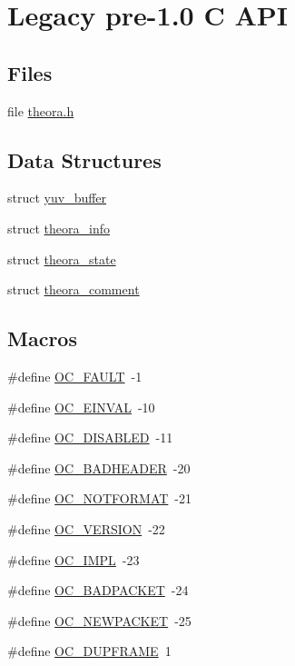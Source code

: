 \hypertarget{group__oldfuncs}{}\section{Legacy pre-\/1.0 C A\+PI}
\label{group__oldfuncs}
\subsection*{Files}
\begin{DoxyCompactItemize}
\item 
file \hyperlink{theora_8h}{theora.\+h}
\end{DoxyCompactItemize}
\subsection*{Data Structures}
\begin{DoxyCompactItemize}
\item 
struct \hyperlink{structyuv__buffer}{yuv\+\_\+buffer}
\item 
struct \hyperlink{structtheora__info}{theora\+\_\+info}
\item 
struct \hyperlink{structtheora__state}{theora\+\_\+state}
\item 
struct \hyperlink{structtheora__comment}{theora\+\_\+comment}
\end{DoxyCompactItemize}
\subsection*{Macros}
\begin{DoxyCompactItemize}
\item 
\#define \hyperlink{group__oldfuncs_gaa4370e13ed3aea6441ccf69dcab2506e}{O\+C\+\_\+\+F\+A\+U\+LT}~-\/1
\item 
\#define \hyperlink{group__oldfuncs_ga43d15091b1a03a734a124e9a04d3be55}{O\+C\+\_\+\+E\+I\+N\+V\+AL}~-\/10
\item 
\#define \hyperlink{group__oldfuncs_ga38b9fa0af856d5930c534db26e2ac2d1}{O\+C\+\_\+\+D\+I\+S\+A\+B\+L\+ED}~-\/11
\item 
\#define \hyperlink{group__oldfuncs_ga809cbad2eb36be17a235a3cadfb737ba}{O\+C\+\_\+\+B\+A\+D\+H\+E\+A\+D\+ER}~-\/20
\item 
\#define \hyperlink{group__oldfuncs_ga9558d6d9eacd2273c8da27f945d725ad}{O\+C\+\_\+\+N\+O\+T\+F\+O\+R\+M\+AT}~-\/21
\item 
\#define \hyperlink{group__oldfuncs_ga4611cfd61160405721d1e2ab0ec2564b}{O\+C\+\_\+\+V\+E\+R\+S\+I\+ON}~-\/22
\item 
\#define \hyperlink{group__oldfuncs_ga895dc2597b3bf9c97bf7701c6eff5b0c}{O\+C\+\_\+\+I\+M\+PL}~-\/23
\item 
\#define \hyperlink{group__oldfuncs_ga117774c062a63dfad2a5b4d092fa2bb1}{O\+C\+\_\+\+B\+A\+D\+P\+A\+C\+K\+ET}~-\/24
\item 
\#define \hyperlink{group__oldfuncs_ga60be4dc92c933eac3542bce3ce076496}{O\+C\+\_\+\+N\+E\+W\+P\+A\+C\+K\+ET}~-\/25
\item 
\#define \hyperlink{group__oldfuncs_ga84a8d2f5080ad62b415a4e7551941cbb}{O\+C\+\_\+\+D\+U\+P\+F\+R\+A\+ME}~1
\end{DoxyCompactItemize}
